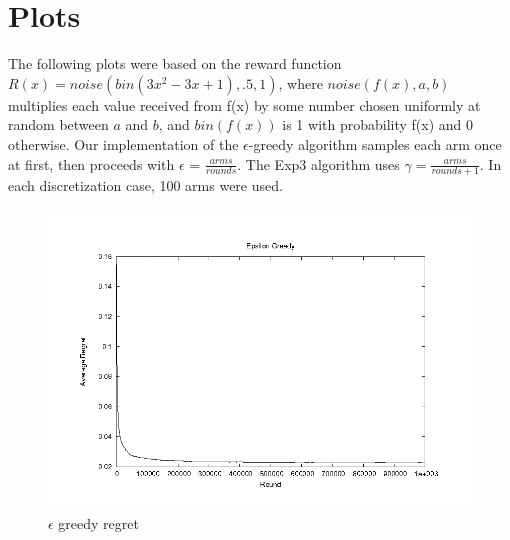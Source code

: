 \documentclass{article}
\begin{document}
\section{Plots}
The following plots were based on the reward function
$R(x) = noise(bin(3x^2 -3x + 1), .5, 1)$, where $noise(f(x), a, b)$
multiplies each value received from f(x) by some number chosen uniformly
at random between $a$ and $b$, and $bin(f(x))$ is 1 with probability
f(x) and 0 otherwise.  Our implementation of the $\epsilon$-greedy 
algorithm samples each arm once at first, then proceeds with
$\epsilon$ = $\frac{arms}{rounds}$.  The Exp3 algorithm uses
$\gamma = \frac{arms}{rounds + 1}$.  In each discretization case, 100
arms were used.

\newcommand{\figwidth}{5in}


\begin{figure}[htb]
  \begin{center}
    \includegraphics[width=\figwidth]{images/e_greed.png}
     \caption{$\epsilon$ greedy regret}
     \label{fig:egreed}
  \end{center}
\end{figure}
\end{document}
